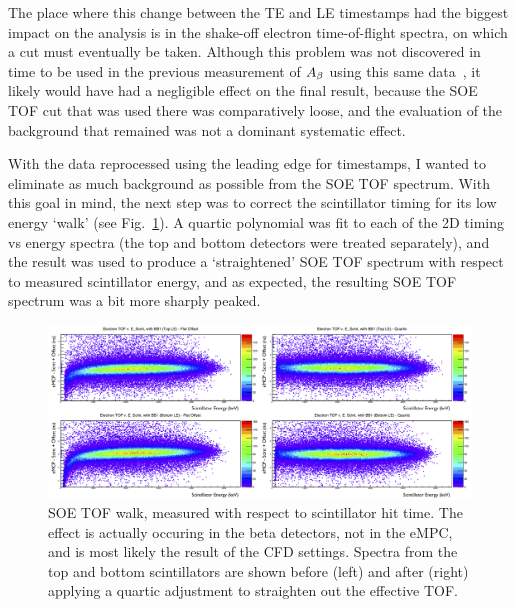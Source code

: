 The place where this change between the TE and LE timestamps had the biggest impact on the analysis is in the shake-off electron time-of-flight spectra, on which a cut must eventually be taken. Although this problem was not discovered in time to be used in the previous measurement of $A_{\beta}$ using this same data~\cite{ben_Abeta}, it likely would have had a negligible effect on the final result, because the SOE TOF cut that was used there was comparatively loose, and the evaluation of the background that remained was not a dominant systematic effect. 

With the data reprocessed using the leading edge for timestamps, I wanted to eliminate as much background as possible from the SOE TOF spectrum.  With this goal in mind, the next step was to correct the scintillator timing for its low energy `walk' (see Fig.~\ref{fig:WalkAdjust}).  A quartic polynomial was fit to each of the 2D timing vs energy spectra (the top and bottom detectors were treated separately), and the result was used to produce a `straightened' SOE TOF spectrum with respect to measured scintillator energy, and as expected, the resulting SOE TOF spectrum was a bit more sharply peaked.  


\begin{figure}[h!!tb]
	\centering
	\includegraphics[width=.999\linewidth]
	{Figures/WalkAdjust.png}
	\caption[SOE TOF Walk and Correction]{SOE TOF walk, measured with respect to scintillator hit time.  The effect is actually occuring in the beta detectors, not in the eMPC, and is most likely the result of the \ac{CFD} settings.  Spectra from the top and bottom scintillators are shown before (left) and after (right) applying a quartic adjustment to straighten out the effective TOF.  
	}	
	\label{fig:WalkAdjust}
\end{figure}


